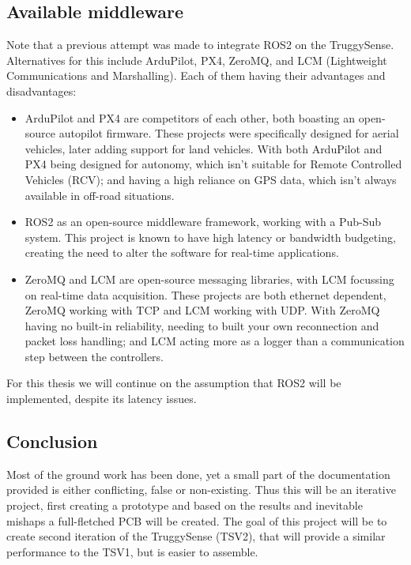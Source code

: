 \documentclass[ti,oneside,10pt]{uantwerpenreport}
\begin{document}
\subsection{Available middleware}
Note that a previous attempt was made to integrate ROS2 on the TruggySense.
Alternatives for this include ArduPilot, PX4, ZeroMQ, and LCM (Lightweight Communications and Marshalling).
Each of them having their advantages and disadvantages:
\begin{itemize}
    \item ArduPilot and PX4 are competitors of each other, both boasting an open-source autopilot firmware.
          These projects were specifically designed for aerial vehicles, later adding support for land vehicles.
          With both ArduPilot and PX4 being designed for autonomy, which isn't suitable for Remote Controlled Vehicles (RCV);
          and having a high reliance on GPS data, which isn't always available in off-road situations.
    \item ROS2 as an open-source middleware framework, working with a Pub-Sub system.
          This project is known to have high latency or bandwidth budgeting, creating the need to alter the software for real-time applications.
    \item ZeroMQ and LCM are open-source messaging libraries, with LCM focussing on real-time data acquisition.
          These projects are both ethernet dependent, ZeroMQ working with TCP and LCM working with UDP.
          With ZeroMQ having no built-in reliability, needing to built your own reconnection and packet loss handling;
          and LCM acting more as a logger than a communication step between the controllers.
\end{itemize}

For this thesis we will continue on the assumption that ROS2 will be implemented, despite its latency issues.

\subsection{Conclusion}
Most of the ground work has been done, yet a small part of the documentation provided is either conflicting, false or non-existing.
Thus this will be an iterative project, first creating a prototype and based on the results and inevitable mishaps a full-fletched PCB will be created.
The goal of this project will be to create second iteration of the TruggySense (TSV2), that will provide a similar performance to the TSV1, but is easier to assemble.
\end{document}
